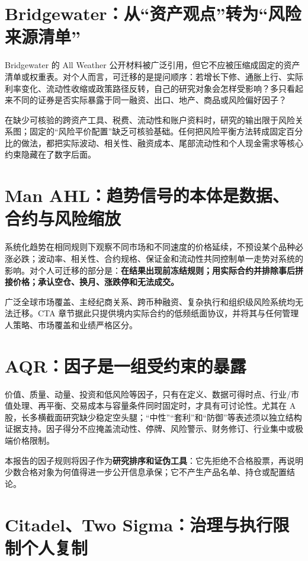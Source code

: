 \section{Bridgewater：从“资产观点”转为“风险来源清单”}

Bridgewater 的 All Weather 公开材料被广泛引用，但它不应被压缩成固定的资产清单或权重表。对个人而言，可迁移的是提问顺序：若增长下修、通胀上行、实际利率变化、流动性收缩或政策路径反转，自己的研究对象会怎样受影响？多只看起来不同的证券是否实际暴露于同一融资、出口、地产、商品或风险偏好因子？

在缺少可核验的跨资产工具、税费、流动性和账户资料时，研究的输出限于风险关系图；固定的“风险平价配置”缺乏可核验基础。任何把风险平衡方法转成固定百分比的做法，都把实际波动、相关性、融资成本、尾部流动性和个人现金需求等核心约束隐藏在了数字后面。

\section{Man AHL：趋势信号的本体是数据、合约与风险缩放}

系统化趋势在相同规则下观察不同市场和不同速度的价格延续，不预设某个品种必涨必跌；波动率、相关性、合约规格、保证金和流动性共同控制单一走势对系统的影响。对个人可迁移的部分是：\textbf{在结果出现前冻结规则；用实际合约并排除事后拼接价格；承认空仓、换月、涨跌停和无法成交。}

广泛全球市场覆盖、主经纪商关系、跨币种融资、复杂执行和组织级风险系统均无法迁移。CTA 章节据此只提供境内实际合约的低频纸面协议，并将其与任何管理人策略、市场覆盖和业绩严格区分。

\section{AQR：因子是一组受约束的暴露}

价值、质量、动量、投资和低风险等因子，只有在定义、数据可得时点、行业/市值处理、再平衡、交易成本与容量条件同时固定时，才具有可讨论性。尤其在 A 股，长多横截面研究缺少稳定空头腿；“中性”“套利”和“防御”等表述须以独立结构证据支持。因子得分不应掩盖流动性、停牌、风险警示、财务修订、行业集中或极端价格限制。

本报告的因子规则将因子作为\textbf{研究排序和证伪工具}：它先拒绝不合格股票，再说明少数合格对象为何值得进一步公开信息承保；它不产生产品名单、持仓或配置结论。

\section{Citadel、Two Sigma：治理与执行限制个人复制}


